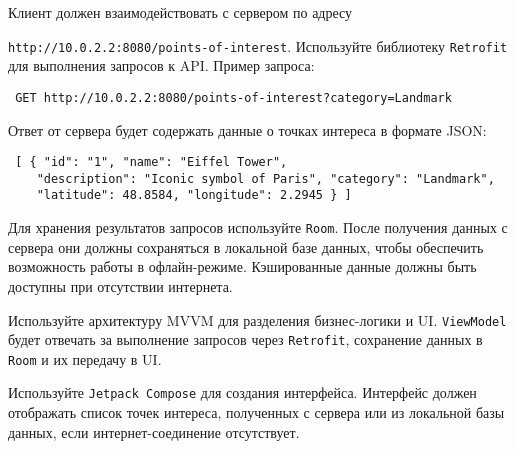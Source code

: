 \documentclass[a4paper,12pt]{article}
\begin{document}
Клиент должен взаимодействовать с сервером по адресу 

\texttt{http://10.0.2.2:8080/points-of-interest}. Используйте библиотеку \texttt{Retrofit} для выполнения запросов к API. Пример запроса:

\begin{verbatim} GET http://10.0.2.2:8080/points-of-interest?category=Landmark \end{verbatim}

Ответ от сервера будет содержать данные о точках интереса в формате JSON:

\begin{verbatim} [ { "id": "1", "name": "Eiffel Tower", 
    "description": "Iconic symbol of Paris", "category": "Landmark", 
    "latitude": 48.8584, "longitude": 2.2945 } ] \end{verbatim}


Для хранения результатов запросов используйте \texttt{Room}. После получения данных с сервера они должны сохраняться в локальной базе данных, чтобы обеспечить возможность работы в офлайн-режиме. Кэшированные данные должны быть доступны при отсутствии интернета.


Используйте архитектуру MVVM для разделения бизнес-логики и UI. \texttt{ViewModel} будет отвечать за выполнение запросов через \texttt{Retrofit}, сохранение данных в \texttt{Room} и их передачу в UI.


Используйте \texttt{Jetpack Compose} для создания интерфейса. Интерфейс должен отображать список точек интереса, полученных с сервера или из локальной базы данных, если интернет-соединение отсутствует.

\end{document}
